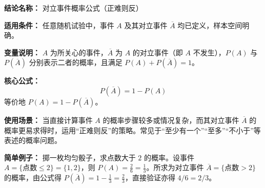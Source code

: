 \textbf{结论名称：} 对立事件概率公式（正难则反）

\textbf{适用条件：} 任意随机试验中，事件 \(A\) 及其对立事件 \(\overline{A}\) 均已定义，样本空间明确。

\textbf{变量说明：} \(A\) 为所关心的事件，\(\overline{A}\) 为 \(A\) 的对立事件（即 \(A\) 不发生），\(P(A)\) 与 \(P(\overline{A})\) 分别表示二者的概率，且满足 \(P(A)+P(\overline{A})=1\)。

\textbf{核心公式：} 
\[
\boxed{P(\overline{A}) = 1 - P(A)}
\]
等价地 \(P(A) = 1 - P(\overline{A})\)。

\textbf{使用场景：} 当直接计算事件 \(A\) 的概率步骤较多或情况复杂，而其对立事件 \(\overline{A}\) 的概率更易求得时，运用“正难则反”的策略。常见于“至少有一个”“至多”“不小于”等表述的概率问题。

\textbf{简单例子：} 掷一枚均匀骰子，求点数大于 \(2\) 的概率。设事件 \(A = \{\text{点数}\le 2\} = \{1,2\}\)，则 \(P(A)=\frac{2}{6}=\frac{1}{3}\)。所求为对立事件 \(\overline{A}=\{\text{点数}>2\}\) 的概率，由公式得 \(P(\overline{A}) = 1 - \frac{1}{3} = \frac{2}{3}\)，直接验证亦得 \(4/6=2/3\)。